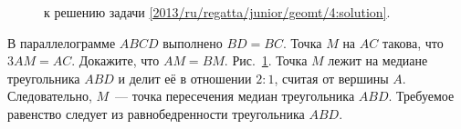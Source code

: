 \ifsolution
\begin{figure}\centering
    \caption{к решению задачи \ref{2013/ru/regatta/junior/geomt/4:solution}.}
    \label{2013/ru/regatta/junior/geomt/4:solution:fig}
\end{figure}%
\fi %

\problem
В параллелограмме $ABCD$ выполнено $BD = BC$.
Точка $M$ на $AC$ такова, что $3 AM = AC$.
Докажите, что $AM = BM$.
\solution
\label{2013/ru/regatta/junior/geomt/4:solution}%
Рис.~\ref{2013/ru/regatta/junior/geomt/4:solution:fig}.
Точка $M$ лежит на медиане треугольника $ABD$ и делит её в отношении $2 : 1$,
считая от вершины $A$.
Следовательно, $M$~--- точка пересечения медиан треугольника $ABD$.
Требуемое равенство следует из равнобедренности треугольника $ABD$.
\endproblem
